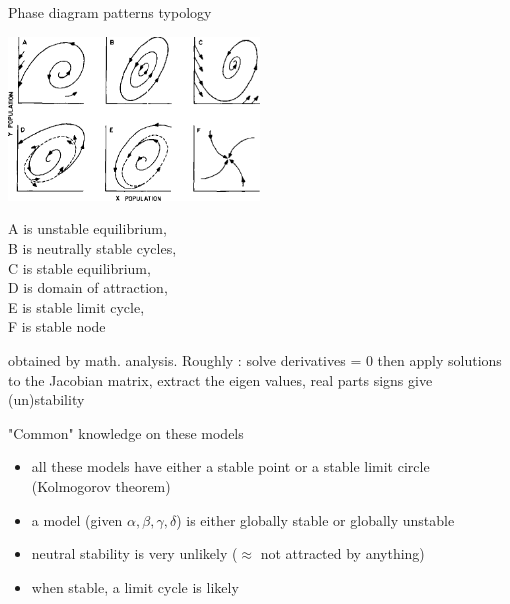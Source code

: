 \documentclass[11,aspectratio=1610]{beamer}
\begin{document}
\begin{frame}{Phase diagram patterns typology}


\centering
\includegraphics[width=0.5\textwidth]{img/behavior_patterns.png}\\
\flushleft



\scriptsize{A is unstable equilibrium, \\ B is neutrally stable cycles,\\ C is stable equilibrium,\\ D is \alert{domain of attraction},\\ E is \alert{stable limit cycle},\\ F is stable node }

\tiny{obtained by math. analysis. Roughly :  solve derivatives = 0  then apply solutions to the Jacobian matrix, extract the eigen values, real parts signs give (un)stability }


  
\end{frame}


\begin{frame}{"Common" knowledge on these models}

\begin{itemize}
\item all these models have either a stable point  or a stable limit circle (Kolmogorov theorem)
\item a model (given ${\alpha, \beta, \gamma,\delta}$) is either globally stable or globally unstable
\item neutral stability is very unlikely ($\approx$ not attracted by anything) 
\item when stable, a limit cycle is likely  
\end{itemize}

\end{frame}
\end{document}
